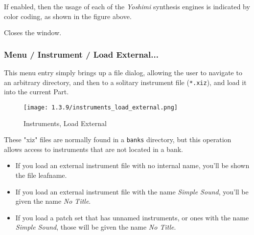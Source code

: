   If enabled, then the usage of each of the \textsl{Yoshimi} synthesis
   engines is indicated by color coding, as shown in the figure above.

   Closes the window.

% 
% 

\subsubsection{Menu / Instrument / Load External...}
\label{subsubsec:menu_instrument_load}

   This menu entry simply brings up a file dialog, allowing the user to
   navigate to an arbitrary directory, and then to a solitary instrument file
   (\texttt{*.xiz}), and load it into the current Part.

\begin{figure}[H]
   \centering 
   \texttt{[image: 1.3.9/instruments\_load\_external.png]}
   \caption{Instruments, Load External}
   \label{fig:instruments_load_external}
\end{figure}

   These "xiz" files are normally found in a \texttt{banks} directory, but this
   operation allows access to instruments that are not located in a bank.

   \begin{itemize}
      \item If you load an external instrument file with no internal name,
         you'll be shown the file leafname.
      \item If you load an external instrument file with the name
         \textsl{Simple Sound}, you'll be given the name \textsl{No Title}.
      \item If you load a patch set that has unnamed instruments, or ones with
         the name \textsl{Simple Sound}, those will be given the name \textsl{No
         Title}.
   \end{itemize}

